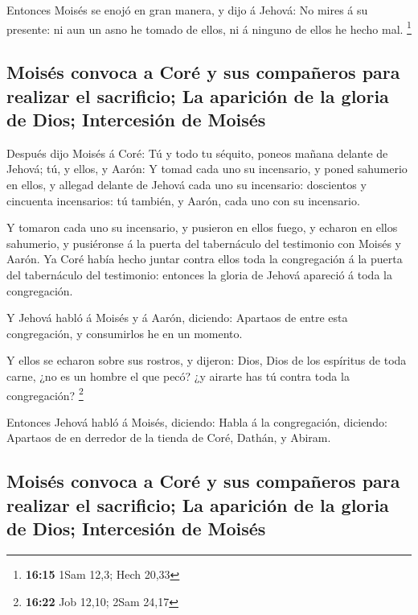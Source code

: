  Entonces Moisés se enojó en gran manera, y dijo á Jehová:
No mires á su presente: ni aun un asno he tomado de ellos, ni á ninguno
de ellos he hecho mal. \footnote{\textbf{16:15} 1Sam 12,3; Hech 20,33}

\hypertarget{moisuxe9s-convoca-a-coruxe9-y-sus-compauxf1eros-para-realizar-el-sacrificio-la-apariciuxf3n-de-la-gloria-de-dios-intercesiuxf3n-de-moisuxe9s}{%
\subsection{Moisés convoca a Coré y sus compañeros para realizar el
sacrificio; La aparición de la gloria de Dios; Intercesión de
Moisés}\label{moisuxe9s-convoca-a-coruxe9-y-sus-compauxf1eros-para-realizar-el-sacrificio-la-apariciuxf3n-de-la-gloria-de-dios-intercesiuxf3n-de-moisuxe9s}}

 Después dijo Moisés á Coré: Tú y todo tu séquito, poneos
mañana delante de Jehová; tú, y ellos, y Aarón:  Y tomad
cada uno su incensario, y poned sahumerio en ellos, y allegad delante de
Jehová cada uno su incensario: doscientos y cincuenta incensarios: tú
también, y Aarón, cada uno con su incensario.

 Y tomaron cada uno su incensario, y pusieron en ellos
fuego, y echaron en ellos sahumerio, y pusiéronse á la puerta del
tabernáculo del testimonio con Moisés y Aarón.  Ya Coré
había hecho juntar contra ellos toda la congregación á la puerta del
tabernáculo del testimonio: entonces la gloria de Jehová apareció á toda
la congregación.

 Y Jehová habló á Moisés y á Aarón, diciendo: 
Apartaos de entre esta congregación, y consumirlos he en un momento.

 Y ellos se echaron sobre sus rostros, y dijeron: Dios,
Dios de los espíritus de toda carne, ¿no es un hombre el que pecó? ¿y
airarte has tú contra toda la congregación? \footnote{\textbf{16:22} Job
  12,10; 2Sam 24,17}

 Entonces Jehová habló á Moisés, diciendo: 
Habla á la congregación, diciendo: Apartaos de en derredor de la tienda
de Coré, Dathán, y Abiram.

\hypertarget{moisuxe9s-convoca-a-coruxe9-y-sus-compauxf1eros-para-realizar-el-sacrificio-la-apariciuxf3n-de-la-gloria-de-dios-intercesiuxf3n-de-moisuxe9s-1}{%
\subsection{Moisés convoca a Coré y sus compañeros para realizar el
sacrificio; La aparición de la gloria de Dios; Intercesión de
Moisés}\label{moisuxe9s-convoca-a-coruxe9-y-sus-compauxf1eros-para-realizar-el-sacrificio-la-apariciuxf3n-de-la-gloria-de-dios-intercesiuxf3n-de-moisuxe9s-1}}

